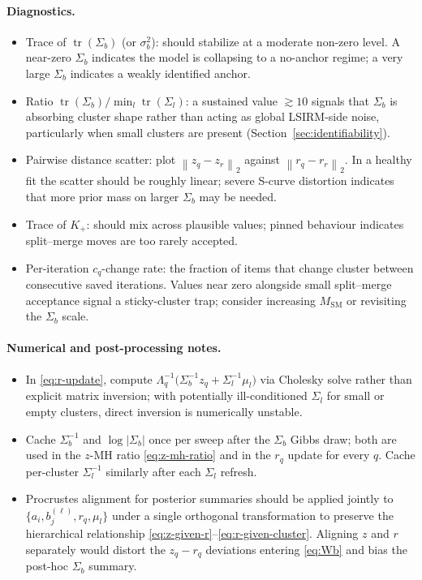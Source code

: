 \documentclass[11pt]{article}
\newcommand{\norm}[1]{\left\lVert #1 \right\rVert}
\DeclareMathOperator{\tr}{tr}
\begin{document}
\paragraph{Diagnostics.}
\begin{itemize}[leftmargin=1.5em]
    \item Trace of $\tr(\Sigma_b)$ (or $\sigma_b^2$): should stabilize at a moderate non-zero level.  A near-zero $\Sigma_b$ indicates the model is collapsing to a no-anchor regime; a very large $\Sigma_b$ indicates a weakly identified anchor.
    \item Ratio $\tr(\Sigma_b)/\min_l\tr(\Sigma_l)$: a sustained value $\gtrsim 10$ signals that $\Sigma_b$ is absorbing cluster shape rather than acting as global LSIRM-side noise, particularly when small clusters are present (Section~\ref{sec:identifiability}).
    \item Pairwise distance scatter: plot $\norm{z_q-z_r}_2$ against $\norm{r_q-r_r}_2$.  In a healthy fit the scatter should be roughly linear; severe S-curve distortion indicates that more prior mass on larger $\Sigma_b$ may be needed.
    \item Trace of $K_+$: should mix across plausible values; pinned behaviour indicates split--merge moves are too rarely accepted.
    \item Per-iteration $c_q$-change rate: the fraction of items that change cluster between consecutive saved iterations.  Values near zero alongside small split--merge acceptance signal a sticky-cluster trap; consider increasing $M_{\mathrm{SM}}$ or revisiting the $\Sigma_b$ scale.
\end{itemize}

\paragraph{Numerical and post-processing notes.}
\begin{itemize}[leftmargin=1.5em]
    \item In \eqref{eq:r-update}, compute
    $\Lambda_q^{-1}\bigl(\Sigma_b^{-1}z_q+\Sigma_{l}^{-1}\mu_l\bigr)$
    via Cholesky solve rather than explicit matrix inversion; with
    potentially ill-conditioned $\Sigma_l$ for small or empty
    clusters, direct inversion is numerically unstable.
    \item Cache $\Sigma_b^{-1}$ and $\log|\Sigma_b|$ once per sweep
    after the $\Sigma_b$ Gibbs draw; both are used in the $z$-MH ratio
    \eqref{eq:z-mh-ratio} and in the $r_q$ update for every $q$.
    Cache per-cluster $\Sigma_l^{-1}$ similarly after each
    $\Sigma_l$ refresh.
    \item Procrustes alignment for posterior summaries should be
    applied jointly to $\{a_i,b_j^{(\ell)},r_q,\mu_l\}$ under a single
    orthogonal transformation to preserve the hierarchical
    relationship \eqref{eq:z-given-r}--\eqref{eq:r-given-cluster}.
    Aligning $z$ and $r$ separately would distort the $z_q-r_q$
    deviations entering \eqref{eq:Wb} and bias the post-hoc
    $\Sigma_b$ summary.
\end{itemize}
\end{document}
